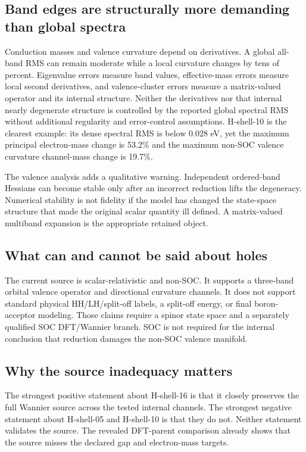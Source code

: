 \documentclass[11pt]{article}
\theoremstyle{definition}
\begin{document}
\subsection{Band edges are structurally more demanding than global spectra}

Conduction masses and valence curvature depend on derivatives.  A global all-band RMS
can remain moderate while a local curvature changes by tens of percent.  Eigenvalue
errors measure band values, effective-mass errors measure local second derivatives, and
valence-cluster errors measure a matrix-valued operator and its internal structure.
Neither the derivatives nor that internal nearly degenerate structure is controlled by
the reported global spectral RMS without additional regularity and error-control
assumptions.  H-shell-10 is the clearest example: its dense spectral RMS is below
0.028 eV, yet the maximum principal electron-mass change is 53.2\% and the maximum
non-SOC valence curvature channel-mass change is 19.7\%.

The valence analysis adds a qualitative warning.  Independent ordered-band Hessians can
become stable only after an incorrect reduction lifts the degeneracy.  Numerical
stability is not fidelity if the model has changed the state-space structure that made
the original scalar quantity ill defined.  A matrix-valued multiband expansion is the
appropriate retained object.

\subsection{What can and cannot be said about holes}

The current source is scalar-relativistic and non-SOC.  It supports a three-band orbital
valence operator and directional curvature channels.  It does not support standard
physical HH/LH/split-off labels, a split-off energy, or final boron-acceptor modeling.
Those claims require a spinor state space and a separately qualified SOC DFT/Wannier
branch.  SOC is not required for the internal conclusion that reduction damages the
non-SOC valence manifold.

\subsection{Why the source inadequacy matters}

The strongest positive statement about H-shell-16 is that it closely preserves the full
Wannier source across the tested internal channels.  The strongest negative statement
about H-shell-05 and H-shell-10 is that they do not.  Neither statement validates the
source.  The revealed DFT-parent comparison already shows that the source misses the
declared gap and electron-mass targets.
\end{document}
